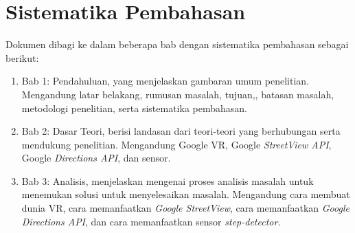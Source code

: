 \section{Sistematika Pembahasan}
\label{sec:sispem}
Dokumen dibagi ke dalam beberapa bab dengan sistematika pembahasan sebagai berikut:
\begin{enumerate}
	\item Bab 1: Pendahuluan, yang menjelaskan gambaran umum penelitian. Mengandung latar belakang, rumusan masalah, tujuan,, batasan masalah, metodologi penelitian, serta sistematika pembahasan.
	\item Bab 2: Dasar Teori, berisi landasan dari teori-teori yang berhubungan serta mendukung penelitian. Mengandung Google VR, Google {\it StreetView API}, Google {\it Directions API}, dan sensor.
	\item Bab 3: Analisis, menjelaskan mengenai proses analisis masalah untuk menemukan solusi untuk menyelesaikan masalah. Mengandung cara membuat dunia VR, cara memanfaatkan \textit{Google StreetView}, cara memanfaatkan \textit{Google Directions API}, dan cara memanfaatkan sensor \textit{step-detector}. 
\end{enumerate}

